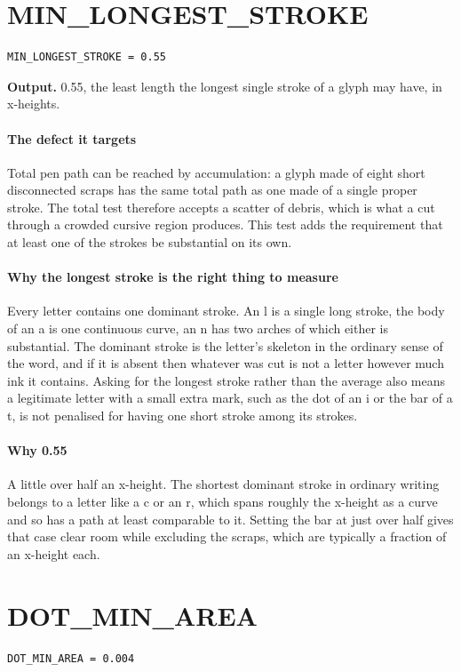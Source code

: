 \section{MIN\_LONGEST\_STROKE}
\begin{lstlisting}[style=sig]
MIN_LONGEST_STROKE = 0.55
\end{lstlisting}

\noindent\textbf{Output.} 0.55, the least length the longest single stroke of a glyph may have, in x-heights.


\paragraph{The defect it targets}
Total pen path can be reached by accumulation: a glyph made of eight short disconnected scraps has the same total path as one made of a single proper stroke. The total test therefore accepts a scatter of debris, which is what a cut through a crowded cursive region produces. This test adds the requirement that at least one of the strokes be substantial on its own.


\paragraph{Why the longest stroke is the right thing to measure}
Every letter contains one dominant stroke. An l is a single long stroke, the body of an a is one continuous curve, an n has two arches of which either is substantial. The dominant stroke is the letter's skeleton in the ordinary sense of the word, and if it is absent then whatever was cut is not a letter however much ink it contains. Asking for the longest stroke rather than the average also means a legitimate letter with a small extra mark, such as the dot of an i or the bar of a t, is not penalised for having one short stroke among its strokes.


\paragraph{Why 0.55}
A little over half an x-height. The shortest dominant stroke in ordinary writing belongs to a letter like a c or an r, which spans roughly the x-height as a curve and so has a path at least comparable to it. Setting the bar at just over half gives that case clear room while excluding the scraps, which are typically a fraction of an x-height each.


\section{DOT\_MIN\_AREA}
\begin{lstlisting}[style=sig]
DOT_MIN_AREA = 0.004
\end{lstlisting}

